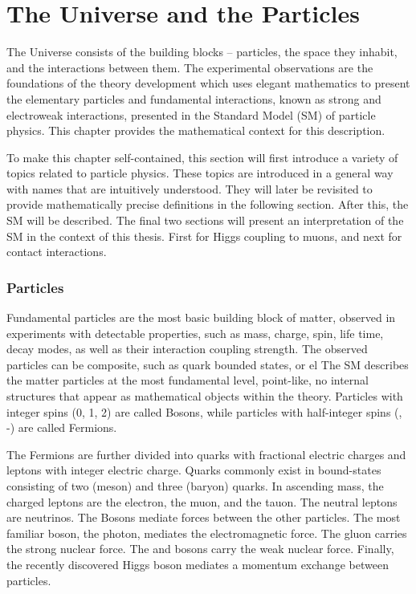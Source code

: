 \section{The Universe and the Particles}

The Universe consists of the building blocks -- particles, the space they inhabit, and the interactions between them.
The experimental observations are the foundations of the theory development which uses elegant mathematics to present the elementary particles and fundamental interactions, known as strong and electroweak interactions, presented in the Standard Model (SM) of particle physics.
This chapter provides the mathematical context for this description.

To make this chapter self-contained, this section will first introduce a variety of topics related to particle physics.
These topics are introduced in a general way with names that are intuitively understood.
They will later be revisited to provide mathematically precise definitions in the following section.
After this, the SM will be described.
The final two sections will present an interpretation of the SM in the context of this thesis. First for Higgs coupling to muons, and next for contact interactions.

\subsubsection{Particles}
Fundamental particles are the most basic building block of matter, observed in experiments with detectable properties, such as mass, charge, spin, life time, decay modes, as well as their interaction coupling strength.
The observed particles can be composite, such as quark bounded states, or el
The SM describes the matter particles at the most fundamental level, point-like, no internal structures that appear as mathematical objects within the theory.
Particles with integer spins (0, 1, 2) are called Bosons, while particles with half-integer spins (\half, -\half) are called Fermions.

The Fermions are further divided into quarks with fractional electric charges and leptons with integer electric charge.
Quarks commonly exist in bound-states consisting of two (meson) and three (baryon) quarks.
In ascending mass, the charged leptons are the electron, the muon, and the tauon.
The neutral leptons are neutrinos.
The Bosons mediate forces between the other particles.
The most familiar boson, the photon, mediates the electromagnetic force.
The gluon carries the strong nuclear force.
The \W and \Z bosons carry the weak nuclear force.
Finally, the recently discovered Higgs boson mediates a momentum exchange between particles.

